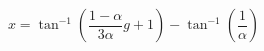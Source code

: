 \begin{equation}\label{Sx}
    x = \tan^{-1}{(\frac{1-\alpha}{3\alpha}g + 1)} - \tan^{-1}{(\frac{1}{\alpha})}
\end{equation}

